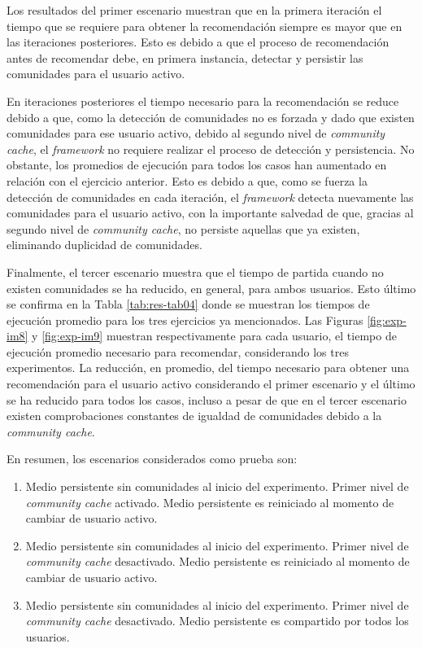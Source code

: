 Los resultados del primer escenario muestran que en la primera iteración el tiempo que se requiere para obtener la recomendación siempre es mayor que en las iteraciones posteriores. Esto es debido a que el proceso de recomendación antes de recomendar debe, en primera instancia, detectar y persistir las comunidades para el usuario activo.

En iteraciones posteriores el tiempo necesario para la recomendación se reduce debido a que, como la detección de comunidades no es forzada y dado que existen comunidades para ese usuario activo, debido al segundo nivel de \textit{community cache}, el \textit{framework} no requiere realizar el proceso de detección y persistencia. No obstante, los promedios de ejecución para todos los casos han aumentado en relación con el ejercicio anterior. Esto es debido a que, como se fuerza la detección de comunidades en cada iteración, el \textit{framework} detecta nuevamente las comunidades para el usuario activo, con la importante salvedad de que, gracias al segundo nivel de \textit{community cache}, no persiste aquellas que ya existen, eliminando duplicidad de comunidades.

Finalmente, el tercer escenario muestra que el tiempo de partida cuando no existen comunidades se ha reducido, en general, para ambos usuarios.  Esto último se confirma en la Tabla \ref{tab:res-tab04} donde se muestran los tiempos de ejecución promedio para los tres ejercicios ya mencionados.  Las Figuras \ref{fig:exp-im8} y \ref{fig:exp-im9} muestran respectivamente para cada usuario, el tiempo de ejecución promedio necesario para recomendar, considerando los tres experimentos. La reducción, en promedio, del tiempo necesario para obtener una recomendación para el usuario activo considerando el primer escenario y el último se ha reducido para todos los casos, incluso a pesar de que en el tercer escenario existen comprobaciones constantes de igualdad de comunidades debido a la \textit{community cache}.

En resumen, los escenarios considerados como prueba son:
\begin{enumerate}[I]
  \item Medio persistente sin comunidades al inicio del experimento. Primer nivel de \textit{community cache} activado. Medio persistente es reiniciado al momento de cambiar de usuario activo.
  \item Medio persistente sin comunidades al inicio del experimento. Primer nivel de \textit{community cache} desactivado. Medio persistente es reiniciado al momento de cambiar de usuario activo.
  \item Medio persistente sin comunidades al inicio del experimento. Primer nivel de \textit{community cache} desactivado. Medio persistente es compartido por todos los usuarios.
\end{enumerate}


